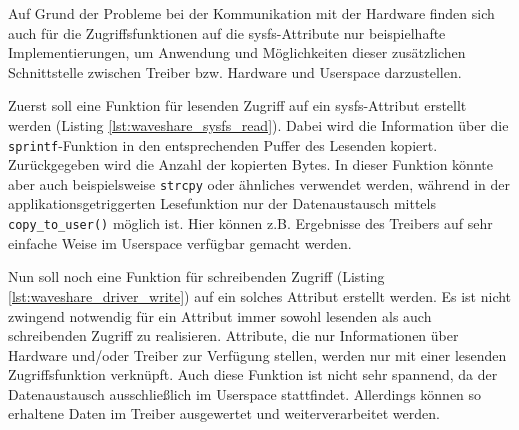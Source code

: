 Auf Grund der Probleme bei der Kommunikation mit der Hardware finden sich auch für die Zugriffsfunktionen auf die sysfs-Attribute nur beispielhafte Implementierungen, um Anwendung und Möglichkeiten dieser zusätzlichen Schnittstelle zwischen Treiber bzw. Hardware und Userspace darzustellen.  

Zuerst soll eine Funktion für lesenden Zugriff auf ein sysfs-Attribut erstellt werden (Listing \ref{lst:waveshare_sysfs_read}). Dabei wird die Information über die \texttt{sprintf}-Funktion in den entsprechenden Puffer des Lesenden kopiert. Zurückgegeben wird die Anzahl der kopierten Bytes. In dieser Funktion könnte aber auch beispielsweise \texttt{strcpy} oder ähnliches verwendet werden, während in der applikationsgetriggerten Lesefunktion nur der Datenaustausch mittels \texttt{copy\_to\_user()} möglich ist. 
Hier können z.B. Ergebnisse des Treibers auf sehr einfache Weise im Userspace verfügbar gemacht werden.




Nun soll noch eine Funktion für schreibenden Zugriff (Listing \ref{lst:waveshare_driver_write}) auf ein solches Attribut erstellt werden. Es ist nicht zwingend notwendig für ein Attribut immer sowohl lesenden als auch schreibenden Zugriff zu realisieren. Attribute, die nur Informationen über Hardware und/oder Treiber zur Verfügung stellen, werden nur mit einer lesenden Zugriffsfunktion verknüpft.
Auch diese Funktion ist nicht sehr spannend, da der Datenaustausch ausschließlich im Userspace stattfindet. Allerdings können so erhaltene Daten im Treiber ausgewertet und weiterverarbeitet werden.




